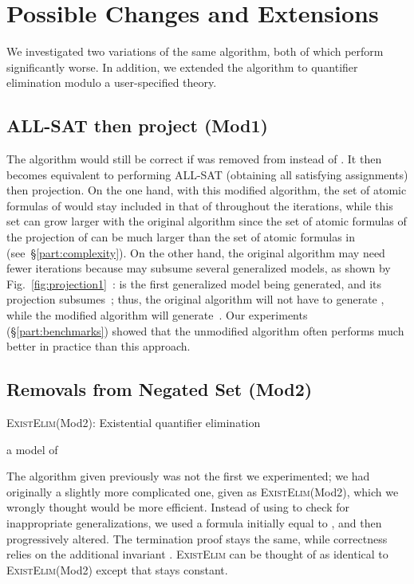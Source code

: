 \section{Possible Changes and Extensions}
We investigated two variations of the same algorithm, both of which perform significantly worse. In addition, we extended the algorithm to quantifier elimination modulo a user-specified theory.

\label{part:variants}

\subsection{ALL-SAT then project  (Mod1)}
\label{part:algo-mod1}
The algorithm would still be correct if  was removed from  instead of . It then becomes equivalent to performing ALL-SAT (obtaining all satisfying assignments) then projection. On the one hand, with this modified algorithm, the set of atomic formulas of  would stay included in that of  throughout the iterations, while this set can grow larger with the original algorithm since the set of atomic formulas of the projection of  can be much larger than the set of atomic formulas in~ (see~\S\ref{part:complexity}). On the other hand, the original algorithm may need fewer iterations because  may subsume several generalized models, as shown by Fig.~\ref{fig:projection1}~:  is the first generalized model being generated, and its projection subsumes~; thus, the original algorithm will not have to generate , while the modified algorithm will generate~. Our experiments (\S\ref{part:benchmarks}) showed that the unmodified algorithm often performs much better in practice than this approach.

\subsection{Removals from Negated Set  (Mod2)}
\begin{algorithm}
\caption{\textsc{ExistElim}(Mod2): Existential quantifier elimination}
\small
\begin{algorithmic}
\STATE 
\STATE 
\STATE 
{}
  \STATE  a model of  \COMMENT{}
  \STATE  \COMMENT{}
  \STATE  \COMMENT{}
  \STATE 
    \COMMENT{}
  \STATE 
  \STATE 
  \STATE 
\ENDWHILE
\ENSURE{}
\end{algorithmic}
\end{algorithm}

\label{part:algo-mod2}
The algorithm given previously was not the first we experimented; we had originally a slightly more complicated one, given as \textsc{ExistElim}(Mod2), which we wrongly thought would be more efficient. Instead of using  to check for inappropriate generalizations, we used a formula  initially equal to , and then progressively altered. The termination proof stays the same, while correctness relies on the additional invariant . \textsc{ExistElim} can be thought of as identical to  \textsc{ExistElim}(Mod2) except that  stays constant.

